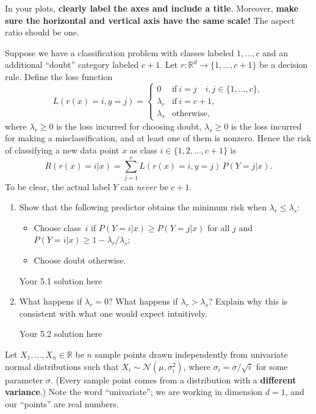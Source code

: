 \documentclass[11pt]{article}
\begin{document}
In your plots, {\bf clearly label the axes and include a title}. Moreover, {\bf make sure the horizontal and vertical axis have the same scale!} The aspect ratio should be one.

\newpage
{}

Suppose we have a classification problem with classes labeled $1, \dotsc, c$ and
an additional ``doubt'' category labeled $c+1$. Let $r : \mathbb{R}^d \to \{1, \dots, c+1 \}$ be a decision rule. Define the loss function
\[
L(r(x) = i, y = j) =
  \begin{cases}
   0 &  \mathrm{if}\ i=j \quad i,j\in\{1,\dotsc,c\}, \\
   \lambda_r       & \mathrm{if}\ i=c+1, \\
   \lambda_s       & \text{otherwise},
  \end{cases}
\]
where $\lambda_r \geq 0$ is the loss incurred for choosing doubt,
$\lambda_s \geq 0$ is the loss incurred for making a misclassification, and at least one of them is nonzero.
Hence the risk of classifying a new data point $x$ as class $i\in\{1,2,\dots,c+1\}$ is
$$R(r(x)=i|x) = \sum_{j=1}^{c} L(r(x) = i, y = j) \, P(Y = j|x).$$
To be clear, the actual label $Y$ can {\em never} be $c + 1$.

\begin{enumerate}
\item Show that the following predictor obtains the minimum risk when $\lambda_r \leq \lambda_s$:
  \begin{itemize}
  \item Choose class~$i$ if $P(Y = i|x) \geq P(Y = j|x)$ for all $j$ and
    $P(Y = i|x) \geq 1-\lambda_r/\lambda_s$;
    \item Choose doubt otherwise.
  \end{itemize}
  
\begin{solution}
Your 5.1 solution here
\end{solution}
\item What happens if $\lambda_r=0$?  What happens if $\lambda_r>\lambda_s$?
  Explain why this is consistent with what one would expect intuitively.
  
\begin{solution}
Your 5.2 solution here
\end{solution}
\end{enumerate}


Let $X_1, \ldots, X_n \in \mathbb{R}$ be
$n$ sample points drawn independently from
univariate normal distributions such that $X_i \sim \mathcal{N}(\mu, \sigma_i^2)$, where
$\sigma_i = \sigma / \sqrt{i}$ for some parameter $\sigma$.
(Every sample point comes from a distribution with a {\bf different variance}.) Note the word ``univariate''; we are working in dimension $d = 1$, and our ``points'' are real numbers.
\end{document}
